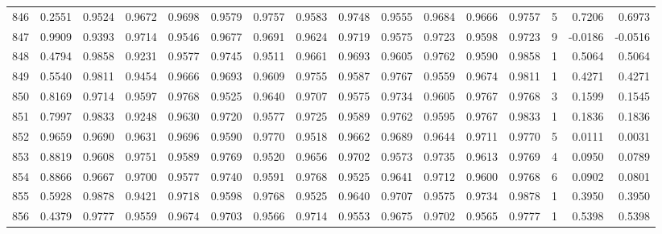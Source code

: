 \begin{tabular}{lrrrrrrrrrrrrrrr}
846 &      0.2551 &  0.9524 &  0.9672 &  0.9698 &  0.9579 &  0.9757 &  0.9583 &  0.9748 &  0.9555 &  0.9684 &   0.9666 &     0.9757 &      5 &                    0.7206 &                     0.6973 \\
847 &      0.9909 &  0.9393 &  0.9714 &  0.9546 &  0.9677 &  0.9691 &  0.9624 &  0.9719 &  0.9575 &  0.9723 &   0.9598 &     0.9723 &      9 &                   -0.0186 &                    -0.0516 \\
848 &      0.4794 &  0.9858 &  0.9231 &  0.9577 &  0.9745 &  0.9511 &  0.9661 &  0.9693 &  0.9605 &  0.9762 &   0.9590 &     0.9858 &      1 &                    0.5064 &                     0.5064 \\
849 &      0.5540 &  0.9811 &  0.9454 &  0.9666 &  0.9693 &  0.9609 &  0.9755 &  0.9587 &  0.9767 &  0.9559 &   0.9674 &     0.9811 &      1 &                    0.4271 &                     0.4271 \\
850 &      0.8169 &  0.9714 &  0.9597 &  0.9768 &  0.9525 &  0.9640 &  0.9707 &  0.9575 &  0.9734 &  0.9605 &   0.9767 &     0.9768 &      3 &                    0.1599 &                     0.1545 \\
851 &      0.7997 &  0.9833 &  0.9248 &  0.9630 &  0.9720 &  0.9577 &  0.9725 &  0.9589 &  0.9762 &  0.9595 &   0.9767 &     0.9833 &      1 &                    0.1836 &                     0.1836 \\
852 &      0.9659 &  0.9690 &  0.9631 &  0.9696 &  0.9590 &  0.9770 &  0.9518 &  0.9662 &  0.9689 &  0.9644 &   0.9711 &     0.9770 &      5 &                    0.0111 &                     0.0031 \\
853 &      0.8819 &  0.9608 &  0.9751 &  0.9589 &  0.9769 &  0.9520 &  0.9656 &  0.9702 &  0.9573 &  0.9735 &   0.9613 &     0.9769 &      4 &                    0.0950 &                     0.0789 \\
854 &      0.8866 &  0.9667 &  0.9700 &  0.9577 &  0.9740 &  0.9591 &  0.9768 &  0.9525 &  0.9641 &  0.9712 &   0.9600 &     0.9768 &      6 &                    0.0902 &                     0.0801 \\
855 &      0.5928 &  0.9878 &  0.9421 &  0.9718 &  0.9598 &  0.9768 &  0.9525 &  0.9640 &  0.9707 &  0.9575 &   0.9734 &     0.9878 &      1 &                    0.3950 &                     0.3950 \\
856 &      0.4379 &  0.9777 &  0.9559 &  0.9674 &  0.9703 &  0.9566 &  0.9714 &  0.9553 &  0.9675 &  0.9702 &   0.9565 &     0.9777 &      1 &                    0.5398 &                     0.5398 \\

\end{tabular}
